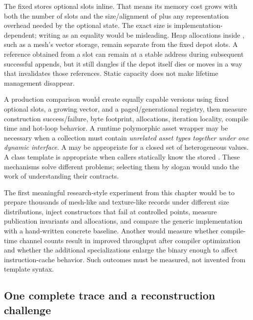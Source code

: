 The fixed  stores  optional slots inline. That means its memory cost grows with both the number of slots and the size/alignment of  plus any representation overhead needed by the optional state. The exact size is implementation-dependent; writing  as an equality would be misleading. Heap allocations inside , such as a mesh's vector storage, remain separate from the fixed depot slots. A reference obtained from a slot can remain at a stable address during subsequent successful appends, but it still dangles if the depot itself dies or moves in a way that invalidates those references. Static capacity does not make lifetime management disappear.

A production comparison would create equally capable versions using fixed optional slots, a growing vector, and a paged/generational registry, then measure construction success/failure, byte footprint, allocations, iteration locality, compile time and hot-loop behavior. A runtime polymorphic asset wrapper may be necessary when a collection must contain \emph{unrelated asset types together under one dynamic interface}. A  may be appropriate for a closed set of heterogeneous values. A class template is appropriate when callers statically know the stored . These mechanisms solve different problems; selecting them by slogan would undo the work of understanding their contracts.

The first meaningful research-style experiment from this chapter would be to prepare thousands of mesh-like and texture-like records under different size distributions, inject constructors that fail at controlled points, measure publication invariants and allocations, and compare the generic implementation with a hand-written concrete baseline. Another would measure whether compile-time channel counts result in improved throughput after compiler optimization and whether the additional specializations enlarge the binary enough to affect instruction-cache behavior. Such outcomes must be measured, not invented from template syntax.

\subsection{One complete trace and a reconstruction challenge}\label{01-foundations-i-ch005-one-complete-trace-and-a-reconstruction-challenge}

